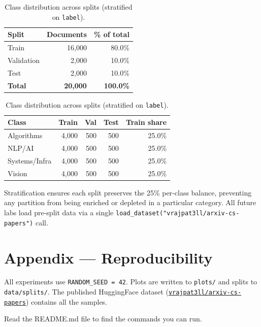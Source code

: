 \documentclass[10pt,a4paper]{article}
\begin{document}
\begin{table}[H]
\centering

\begin{minipage}[t]{0.48\linewidth}
\centering
\small
\caption{Dataset split sizes.}
\begin{tabular}{lrr}
\toprule
\textbf{Split} & \textbf{Documents} & \textbf{\% of total} \\
\midrule
Train      & 16{,}000 & 80.0\% \\
Validation &  2{,}000 & 10.0\% \\
Test       &  2{,}000 & 10.0\% \\
\midrule
\textbf{Total} & \textbf{20{,}000} & \textbf{100.0\%} \\
\bottomrule
\end{tabular}
\end{minipage}
\hfill
\begin{minipage}[t]{0.48\linewidth}
\centering
\small
\caption{Class distribution across splits (stratified on \texttt{label}).}
\begin{tabular}{lrrrr}
\toprule
\textbf{Class} & \textbf{Train} & \textbf{Val} & \textbf{Test} & \textbf{Train share} \\
\midrule
Algorithms    & 4{,}000 & 500 & 500 & 25.0\% \\
NLP/AI        & 4{,}000 & 500 & 500 & 25.0\% \\
Systems/Infra & 4{,}000 & 500 & 500 & 25.0\% \\
Vision        & 4{,}000 & 500 & 500 & 25.0\% \\
\bottomrule
\end{tabular}
\end{minipage}

\end{table}

Stratification ensures each split preserves the 25\% per-class balance, preventing any partition from being enriched or depleted in a particular category. All future labs load pre-split data via a single \texttt{load\_dataset("vrajpat3ll/arxiv-cs-papers")} call.

\section*{Appendix --- Reproducibility}

All experiments use \texttt{RANDOM\_SEED = 42}. Plots are written to \texttt{plots/} and splits to \texttt{data/splits/}. The published HuggingFace dataset (\href{https://huggingface.co/datasets/vrajpat3ll/arxiv-cs-papers}{\texttt{vrajpat3ll/arxiv-cs-papers}}) contains all the samples.

Read the README.md file to find the commands you can run.
\end{document}

